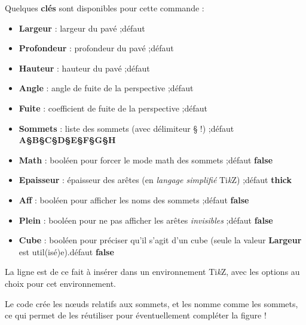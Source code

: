 \documentclass[a4paper,french,11pt]{article}
\providecommand\tikzlogo{Ti\textit{k}Z}
\let\TikZ\tikzlogo
\newcommand\Cle[1]{{\bfseries\sffamily\textlangle #1\textrangle}}
\begin{document}
\begin{codecles}
Quelques \Cle{clés} sont disponibles pour cette commande :

\begin{itemize}
	\item \Cle{Largeur} : largeur du pavé ;\hfill{}défaut \Cle{2}
	\item \Cle{Profondeur} : profondeur du pavé ;\hfill{}défaut \Cle{1}
	\item \Cle{Hauteur} : hauteur du pavé ;\hfill{}défaut \Cle{1.25}
	\item \Cle{Angle} : angle de fuite de la perspective ;\hfill{}défaut \Cle{30}
	\item \Cle{Fuite} : coefficient de fuite de la perspective ;\hfill{}défaut \Cle{0.5}
	\item \Cle{Sommets} : liste des sommets (avec délimiteur § !) ;\hfill{}défaut \Cle{A§B§C§D§E§F§G§H}
	\item \Cle{Math} : booléen pour forcer le mode math des sommets ;\hfill{}défaut \Cle{false}
	\item \Cle{Epaisseur} : épaisseur des arêtes (en \textit{langage simplifié} \TikZ) ;\hfill{}défaut \Cle{thick}
	\item \Cle{Aff} : booléen pour afficher les noms des sommets ;\hfill{}défaut \Cle{false}
	\item \Cle{Plein} : booléen pour ne pas afficher les arêtes \textit{invisibles} ;\hfill{}défaut \Cle{false}
	\item \Cle{Cube} : booléen pour préciser qu'il s'agit d'un cube (seule la valeur \Cle{Largeur} est util(isé)e).\hfill{}défaut \Cle{false}
\end{itemize}
\end{codecles}

\begin{codetex}
\PaveTikz
\end{codetex}

\begin{codetex}
\PaveTikz[Cube,Largeur=2]
\end{codetex}

\begin{codeinfo}
La ligne est de ce fait à insérer dans un environnement \TikZ, avec les options au choix pour cet environnement.

Le code crée les nœuds relatifs aux sommets, et les nomme comme les sommets, ce qui permet de les réutiliser pour éventuellement compléter la figure !
\end{codeinfo}
\end{document}
